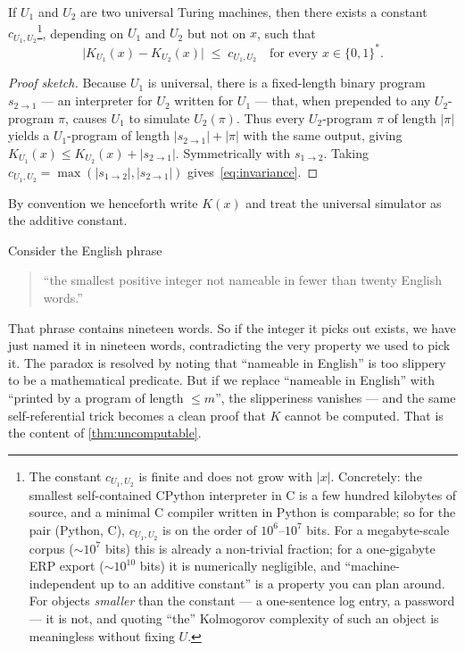 \begin{theorem}
\label{thm:invariance}
If $U_1$ and $U_2$ are two universal Turing machines, then there
exists a constant $c_{U_1,U_2}$\footnote{The constant $c_{U_1,U_2}$
is finite and does not grow with $|x|$.  Concretely: the smallest
self-contained CPython interpreter in C is a few hundred kilobytes of
source, and a minimal C compiler written in Python is comparable; so
for the pair (Python, C), $c_{U_1,U_2}$ is on the order of
$10^6$--$10^7$ bits.  For a megabyte-scale corpus ($\sim\!10^7$ bits)
this is already a non-trivial fraction; for a one-gigabyte ERP export
($\sim\!10^{10}$ bits) it is numerically negligible, and
``machine-independent up to an additive constant'' is a property you
can plan around.  For objects \emph{smaller} than the constant --- a
one-sentence log entry, a password --- it is not, and quoting ``the''
Kolmogorov complexity of such an object is meaningless without fixing
$U$.}, depending on $U_1$ and $U_2$ but not on $x$, such that
\begin{equation}
  \bigl| K_{U_1}(x) - K_{U_2}(x) \bigr| \;\le\; c_{U_1,U_2}
  \quad \text{for every } x \in \{0,1\}^*.
  \label{eq:invariance}
\end{equation}
\end{theorem}

\begin{proof}[Proof sketch]
Because $U_1$ is universal, there is a fixed-length binary program
$s_{2\to 1}$ --- an interpreter for $U_2$ written for $U_1$ --- that,
when prepended to any $U_2$-program $\pi$, causes $U_1$ to simulate
$U_2(\pi)$.  Thus every $U_2$-program $\pi$ of length $|\pi|$ yields a
$U_1$-program of length $|s_{2\to 1}| + |\pi|$ with the same output,
giving $K_{U_1}(x) \le K_{U_2}(x) + |s_{2\to 1}|$.  Symmetrically with
$s_{1\to 2}$.  Taking $c_{U_1,U_2} = \max(|s_{1\to 2}|, |s_{2\to 1}|)$
gives~\eqref{eq:invariance}.
\end{proof}

By convention we henceforth write $K(x)$ and treat the universal
simulator as the additive constant.

\begin{intuition}[title={The Berry paradox, dramatised}]
Consider the English phrase
\begin{quote}
``the smallest positive integer not nameable in fewer than twenty
English words.''
\end{quote}
That phrase contains nineteen words.  So if the integer it picks out
exists, we have just named it in nineteen words, contradicting the
very property we used to pick it.  The paradox is resolved by noting
that ``nameable in English'' is too slippery to be a mathematical
predicate.  But if we replace ``nameable in English'' with ``printed
by a program of length $\le m$'', the slipperiness vanishes --- and
the same self-referential trick becomes a clean proof that $K$ cannot
be computed.  That is the content of \cref{thm:uncomputable}.
\end{intuition}

